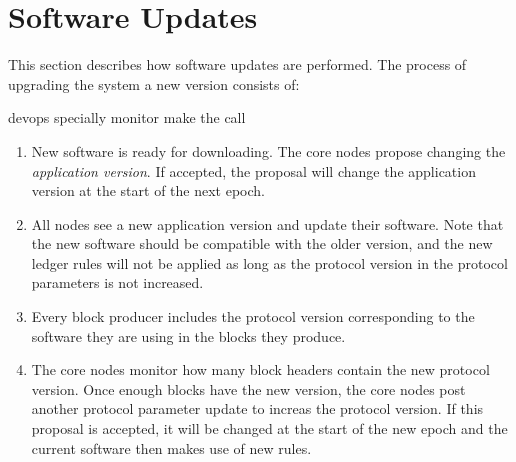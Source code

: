 \section{Software Updates}
\label{sec:software-updates}

This section describes how software updates are performed.
The process of upgrading the system a new version consists of:

devops specially monitor
make the call



\begin{enumerate}
  \item New software is ready for downloading. The core nodes propose changing the
    \textit{application version}. If accepted, the proposal
    will change the application version at the start of the next epoch.
  \item All nodes see a new application version and update their software.
    Note that the new software should be compatible with the older version, and the new
    ledger rules will not be applied as long as the protocol version in the
    protocol parameters is not increased.
  \item Every block producer includes the protocol version corresponding to the software
    they are using in the blocks they produce.
  \item The core nodes monitor how many block headers contain the new protocol version.
    Once enough blocks have the new version, the core nodes post another protocol parameter
    update to increas the protocol version.
    If this proposal is accepted, it will be changed at the start of the new epoch and
    the current software then makes use of new rules.
\end{enumerate}
